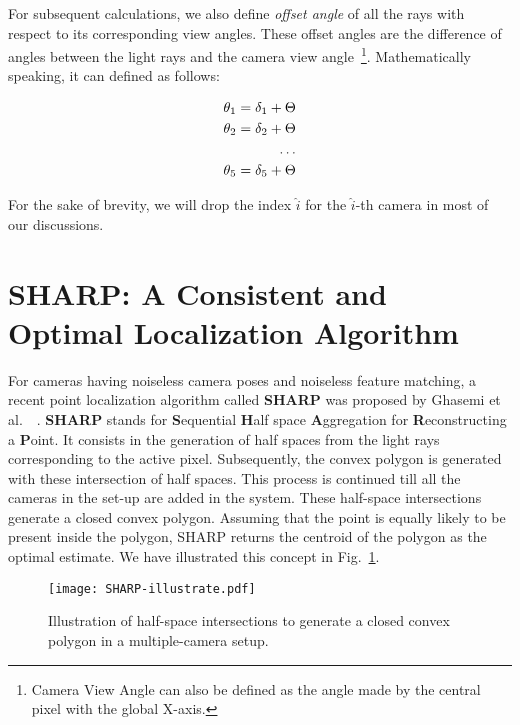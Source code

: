 For subsequent calculations, we also define \emph{offset angle} of all the rays with respect to its corresponding view angles. These offset angles are the difference of angles between the light rays and the camera view angle~\footnote{Camera View Angle can also be defined as the angle made by the central pixel with the global X-axis.}. Mathematically speaking, it can defined as follows:

\begin{equation*}
\centering
\begin{aligned}
\theta_1 = \delta_1 + \Theta \\
\theta_2 = \delta_2 + \Theta \\
\ldots \\
\theta_5 = \delta_5 + \Theta \\
\end{aligned}
\end{equation*}

For the sake of brevity, we will drop the index $\hat{i}$ for the $\hat{i}$-th camera in most of our discussions.

\section{SHARP: A Consistent and Optimal Localization Algorithm}
\label{sec:SHARP}
For cameras having noiseless camera poses and noiseless feature matching, a recent point localization algorithm called \textbf{SHARP} was proposed by Ghasemi et al.\ ~\cite{SHARP}. \textbf{SHARP} stands for \textbf{S}equential \textbf{H}alf space \textbf{A}ggregation for \textbf{R}econstructing a \textbf{P}oint. It consists in the generation of half spaces from the light rays corresponding to the active pixel. Subsequently, the convex polygon is generated with these intersection of half spaces. This process is continued till all the cameras in the set-up are added in the system. These half-space intersections generate a closed convex polygon. Assuming that the point is equally likely to be present inside the polygon, SHARP returns the centroid of the polygon as the optimal estimate. We have illustrated this concept in Fig.~\ref{fig:sharp-fig}.

\begin{figure}[htb]
\centering
{\texttt{[image: SHARP-illustrate.pdf]}}
\caption{Illustration of half-space intersections to generate a closed convex polygon in a multiple-camera setup.}
\label{fig:sharp-fig}
\end{figure}

